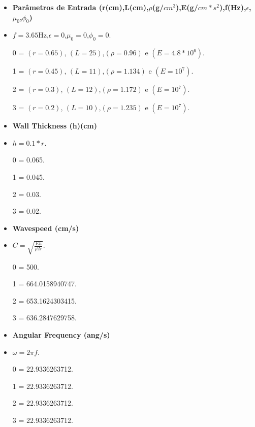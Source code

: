 \documentclass[10pt,aspectratio=169]{beamer}
\theoremstyle{remark}
\theoremstyle{definition}
\begin{document}
\begin{frame}[allowframebreaks]
		\framebreak
		
		\begin{itemize}
			\item \textbf{Parâmetros de Entrada (r(cm),L(cm),$\rho$(g/$cm^3$),E(g/$cm*s^2$),f(Hz),$\epsilon$,$\mu_0$,$\phi_0$)}
			\item $ f =3.65$Hz,$\epsilon = 0$,$\mu_0 = 0$,$\phi_0 = 0$.
			\item [0] = $(r = 0.65)$, $(L = 25)$,$(\rho = 0.96)$ e $(E = 4.8 * 10^6)$.
			\item [1] = $(r = 0.45)$, $(L = 11)$,$(\rho = 1.134)$ e $(E = 10^7)$.
			\item [2] = $(r = 0.3)$, $(L = 12)$,$(\rho = 1.172)$ e $(E = 10^7)$.
			\item [3] = $(r = 0.2)$, $(L = 10)$,$(\rho = 1.235)$ e $(E = 10^7)$.
			
		\end{itemize}
		
		\framebreak

		\begin{itemize}
			\item \textbf{Wall Thickness (h)(cm)}
			\item $ h = 0.1 * r $.
			\item [0] = 0.065.
			\item [1] = 0.045.
			\item [2] = 0.03.
			\item [3] = 0.02.
			
		\end{itemize}
		
		\framebreak
		
		\begin{itemize}
			\item \textbf{Wavespeed (cm/s)}
			\item $ C = \sqrt{\frac{Eh}{\rho 2 r}}$.
			\item [0] = 500.
			\item [1] = 664.0158940747.
			\item [2] = 653.1624303415.
			\item [3] = 636.2847629758.
		
		\end{itemize}
		
		\framebreak
		
		\begin{itemize}
		\item \textbf{Angular Frequency (ang/s)}
		\item $ \omega = 2 \pi f$.
		\item [0] = 22.9336263712.
		\item [1] = 22.9336263712.
		\item [2] = 22.9336263712.
		\item [3] = 22.9336263712.
		

\end{itemize}
\end{frame}
\end{document}
